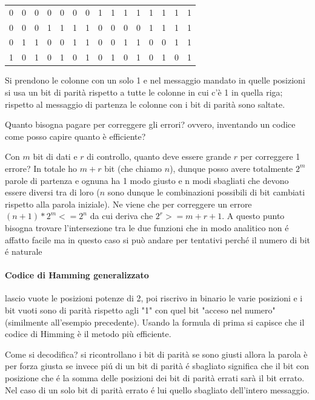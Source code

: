 \documentclass{article}
\begin{document}
\begin{center}
    \begin{tabular}{|c|c|c|c|c|c|c|c|c|c|c|c|c|c|c|}
        \hline
        0	& 0	& 0	& 0	& 0	& 0	& 0	& 1	& 1	& 1	& 1	& 1	& 1	& 1	& 1 \\
        0	& 0	&0	&1	&1	&1	&1	&0	&0	&0	&0	&1	&1	&1	&1 \\
        0	&1	&1	&0	&0	&1	&1	&0	&0	&1	&1	&0	&0	&1	&1 \\
        1	&0	&1	&0	&1	&0	&1	&0	&1	&0	&1	&0	&1	&0	&1 \\
        \hline
    \end{tabular}
\end{center}

Si prendono le colonne con un solo 1 e nel messaggio mandato in quelle posizioni si usa un bit di parità rispetto a tutte le colonne in cui c'è 1 in quella riga; rispetto al messaggio di partenza le colonne con i bit di parità sono saltate.

Quanto bisogna pagare per correggere gli errori? ovvero, inventando un codice come posso capire quanto è efficiente?

Con $m$ bit di dati e $r$ di controllo, quanto deve essere grande $r$ per correggere 1 errore?
In totale ho $m+r$ bit (che chiamo $n$),  dunque posso avere totalmente $2^m$ parole di partenza e ognuna ha 1 modo giusto e n modi sbagliati che devono essere diversi tra di loro ($n$ sono dunque le combinazioni possibili di bit cambiati rispetto alla parola iniziale). 
Ne viene che per correggere un errore $(n+1)*2^m <= 2^n$ da cui deriva che $2^r >= m + r + 1$. A questo punto bisogna trovare l'intersezione tra le due funzioni che in modo analitico non é affatto facile ma in questo caso si può andare per tentativi perché il numero di bit é naturale

\paragraph{Codice di Hamming generalizzato} lascio vuote le posizioni potenze di 2, poi riscrivo in binario le varie posizioni e i bit vuoti sono di parità rispetto agli "1" con quel bit "acceso nel numero" (similmente all'esempio precedente). Usando la formula di prima si capisce che il codice di Himming è il metodo più efficiente.

Come si decodifica? si ricontrollano i bit di parità se sono giusti allora la parola è per forza giusta se invece piú di un bit di parità é sbagliato significa che il bit con posizione che é la somma delle posizioni dei bit di parità errati sarà il bit errato. Nel caso di un solo bit di parità errato é lui quello sbagliato dell'intero messaggio.
\end{document}
